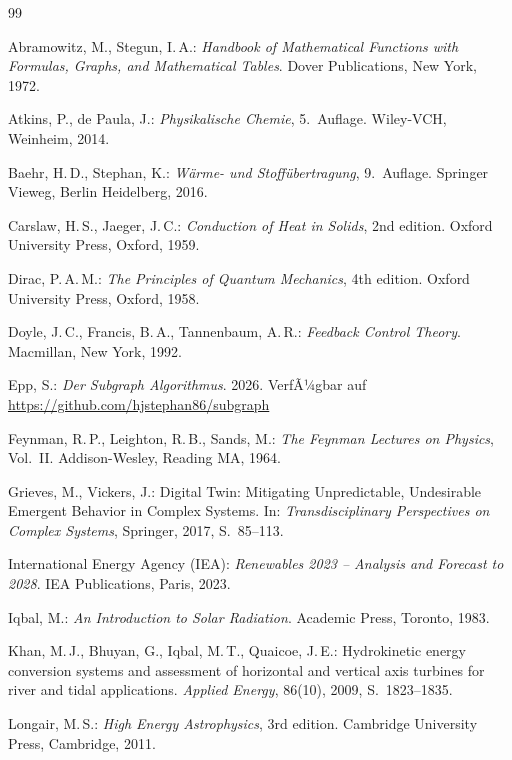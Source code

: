 ﻿\documentclass[a4paper,12pt]{article}
\theoremstyle{definition}
\begin{document}
\begin{thebibliography}{99}

Abramowitz, M., Stegun, I.\,A.:
\textit{Handbook of Mathematical Functions with Formulas, Graphs, and Mathematical Tables}.
Dover Publications, New York, 1972.

Atkins, P., de Paula, J.:
\textit{Physikalische Chemie}, 5.~Auflage.
Wiley-VCH, Weinheim, 2014.

Baehr, H.\,D., Stephan, K.:
\textit{W\"arme- und Stoff\"ubertragung}, 9.~Auflage.
Springer Vieweg, Berlin Heidelberg, 2016.

Carslaw, H.\,S., Jaeger, J.\,C.:
\textit{Conduction of Heat in Solids}, 2nd edition.
Oxford University Press, Oxford, 1959.

Dirac, P.\,A.\,M.:
\textit{The Principles of Quantum Mechanics}, 4th edition.
Oxford University Press, Oxford, 1958.

Doyle, J.\,C., Francis, B.\,A., Tannenbaum, A.\,R.:
\textit{Feedback Control Theory}.
Macmillan, New York, 1992.

Epp, S.:
\textit{Der Subgraph Algorithmus}. 2026. VerfÃ¼gbar auf \url{https://github.com/hjstephan86/subgraph}

Feynman, R.\,P., Leighton, R.\,B., Sands, M.:
\textit{The Feynman Lectures on Physics}, Vol.~II.
Addison-Wesley, Reading MA, 1964.

Grieves, M., Vickers, J.:
Digital Twin: Mitigating Unpredictable, Undesirable Emergent Behavior in Complex Systems.
In: \textit{Transdisciplinary Perspectives on Complex Systems}, Springer, 2017, S.~85--113.

International Energy Agency (IEA):
\textit{Renewables 2023 -- Analysis and Forecast to 2028}.
IEA Publications, Paris, 2023.

Iqbal, M.:
\textit{An Introduction to Solar Radiation}.
Academic Press, Toronto, 1983.

Khan, M.\,J., Bhuyan, G., Iqbal, M.\,T., Quaicoe, J.\,E.:
Hydrokinetic energy conversion systems and assessment of horizontal and vertical axis turbines for river and tidal applications.
\textit{Applied Energy}, 86(10), 2009, S.~1823--1835.

Longair, M.\,S.:
\textit{High Energy Astrophysics}, 3rd edition.
Cambridge University Press, Cambridge, 2011.


\end{thebibliography}
\end{document}
